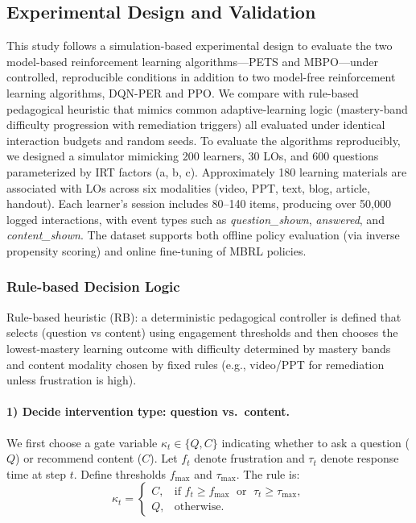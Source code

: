 \documentclass[preprint,12pt]{elsarticle}
\begin{document}
\begin{frontmatter}
\subsection{Experimental Design and Validation}
This study follows a simulation-based experimental design to evaluate the two model-based reinforcement learning algorithms—PETS and MBPO—under controlled, reproducible conditions in addition to two model-free reinforcement learning algorithms, DQN-PER and PPO. We compare with rule-based pedagogical heuristic that mimics common adaptive-learning logic (mastery-band difficulty progression with remediation triggers) all evaluated under identical interaction budgets and random seeds.
To evaluate the algorithms reproducibly, we designed a simulator mimicking 200 learners, 30 LOs, and 600 questions parameterized by IRT factors (a, b, c). Approximately 180 learning materials are associated with LOs across six modalities (video, PPT, text, blog, article, handout). Each learner’s session includes 80–140 items, producing over 50,000 logged interactions, with event types such as \textit{question\_shown}, \textit{answered}, and \textit{content\_shown}. The dataset supports both offline policy evaluation (via inverse propensity scoring) and online fine-tuning of MBRL policies.

\subsubsection{Rule-based Decision Logic}
Rule-based heuristic (RB): a deterministic pedagogical controller is defined that selects (question vs content) using engagement thresholds and then chooses the lowest-mastery learning outcome with difficulty determined by mastery bands and content modality chosen by fixed rules (e.g., video/PPT for remediation unless frustration is high).
\paragraph{1) Decide intervention type: question vs.\ content.}

We first choose a gate variable $\kappa_t \in \{Q,C\}$ indicating whether to ask a question ($Q$) or recommend content ($C$). Let $f_t$ denote frustration and $\tau_t$ denote response time at step $t$. Define thresholds $f_{\max}$ and $\tau_{\max}$. The rule is:
\[
\kappa_t =
\begin{cases}
C, & \text{if } f_t \ge f_{\max} \;\text{ or }\; \tau_t \ge \tau_{\max},\\[4pt]
Q, & \text{otherwise}.
\end{cases}
\]


\end{frontmatter}
\end{document}
